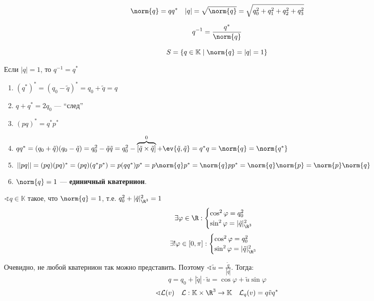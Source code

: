 \begin{definition}
	\[\norm{q} = q q^* \quad |q| = \sqrt{\norm{q}} = \sqrt{q_0^2 + q_1^2 + q_2^2 + q_3^2} \]
\end{definition}

\begin{definition}
	\[q^{-1} = \frac{q^*}{\norm{q}}\]
\end{definition}

\begin{definition}
	\[S = \{q \in \mathbb{K} \mid \norm{q} = |q| = 1\}\]
\end{definition}

\begin{remark}
	Если \(|q| = 1\), то  \(q^{-1} = q^*\)
\end{remark}

\begin{prop}\itemfix
	\begin{enumerate}
		\item $(q^*)^* = (q_0 - \tilde{q})^* = q_0 + \tilde{q} = q$
		\item $q + q^* = 2 q_0$ --- ``след''
		\item $(pq)^* = q^* p^*$
		\item $q q^* = (q_0 + \tilde{q}) (q_0 - \tilde{q}) = q_0^2 - \tilde{q} \tilde{q} = q_0^2 - \overbrace{[\tilde{q} \times \tilde{q}]}^0 + \ev{\tilde{q}, \tilde{q}} = q^* q = \norm{q} = \norm{q^*}$
		\item $||pq|| = (pq)(pq)^* = (pq) (q^* p^*) = p (qq^*) p^* = p \norm{q} p^* = \norm{q} p p^* = \norm{q} \norm{p} = \norm{p} \norm{q}$
		\item $\norm{q} = 1$ --- \textbf{единичный кватернион}.
	\end{enumerate}
\end{prop}

\(\sphericalangle q \in \mathbb{K}\) такое, что \(\norm{q} = 1\), т.е. \(q_0^2 + |\tilde{q}|^2_{\R^3} = 1\)
\[\exists \varphi \in \R : \begin{cases}
		\cos^2 \varphi = q_0^2 \\
		\sin^2 \varphi = |\tilde{q}|^2_{\R^3}
	\end{cases}\]
\[\exists! \varphi \in [0, \pi] : \begin{cases}
		\cos^2 \varphi = q_0^2 \\
		\sin^2 \varphi = |\tilde{q}|^2_{\R^3}
	\end{cases}\]

Очевидно, не любой кватернион так можно представить. Поэтому \(\sphericalangle \tilde{u} = \frac{\tilde{q}}{|\tilde{q}|}\). Тогда:
\[q = q_0 + |\tilde{q}| \cdot \tilde{u} = \cos \varphi + \tilde{u} \sin \varphi\]
\[\sphericalangle \mathcal{L}(v) \quad \mathcal{L} : \mathbb{K} \times \R^3 \to \mathbb{K} \quad \mathcal{L}_q(v) = q \tilde{v} q^*\]


